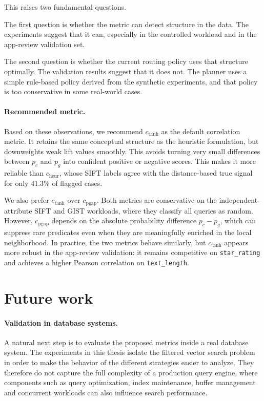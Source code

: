 This raises two fundamental questions.

The first question is whether the metric can detect structure in the data.
The experiments suggest that it can, especially in the controlled workload and in the app-review validation set.

The second question is whether the current routing policy uses that structure optimally.
The validation results suggest that it does not.
The planner uses a simple rule-based policy derived from the synthetic experiments, and that policy is too conservative in some real-world cases.

\paragraph{Recommended metric.}

Based on these observations, we recommend \(c_{\mathrm{tanh}}\) as the default correlation metric.
It retains the same conceptual structure as the heuristic formulation, but downweights weak lift values smoothly.
This avoids turning very small differences between \(p_c\) and \(p_g\) into confident positive or negative scores.
This makes it more reliable than \(c_{\mathrm{heur}}\), whose SIFT labels agree with the distance-based true signal for only \(41.3\%\) of flagged cases.

We also prefer \(c_{\mathrm{tanh}}\) over \(c_{\mathrm{pgap}}\).
Both metrics are conservative on the independent-attribute SIFT and GIST workloads, where they classify all queries as random.
However, \(c_{\mathrm{pgap}}\) depends on the absolute probability difference \(p_c-p_g\), which can suppress rare predicates even when they are meaningfully enriched in the local neighborhood.
In practice, the two metrics behave similarly, but \(c_{\mathrm{tanh}}\) appears more robust in the app-review validation: it remains competitive on \texttt{star\_rating} and achieves a higher Pearson correlation on \texttt{text\_length}.

\section{Future work}

\paragraph{Validation in database systems.}

A natural next step is to evaluate the proposed metrics inside a real database system.
The experiments in this thesis isolate the filtered vector search problem in order to make the behavior of the different strategies easier to analyze. 
They therefore do not capture the full complexity of a production query engine, where components such as query optimization, index maintenance, buffer management and concurrent workloads can also influence search performance.

